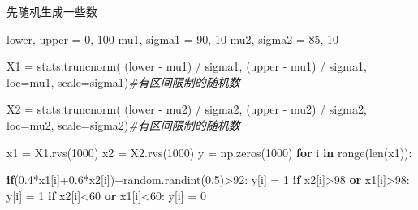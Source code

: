 \documentclass[
]{article}
\newenvironment{Shaded}{}{}
\newcommand{\BuiltInTok}[1]{#1}
\newcommand{\CommentTok}[1]{\textcolor[rgb]{0.38,0.63,0.69}{\textit{#1}}}
\newcommand{\ControlFlowTok}[1]{\textcolor[rgb]{0.00,0.44,0.13}{\textbf{#1}}}
\newcommand{\DecValTok}[1]{\textcolor[rgb]{0.25,0.63,0.44}{#1}}
\newcommand{\FloatTok}[1]{\textcolor[rgb]{0.25,0.63,0.44}{#1}}
\newcommand{\KeywordTok}[1]{\textcolor[rgb]{0.00,0.44,0.13}{\textbf{#1}}}
\newcommand{\NormalTok}[1]{#1}
\newcommand{\OperatorTok}[1]{\textcolor[rgb]{0.40,0.40,0.40}{#1}}
\begin{document}
先随机生成一些数

\begin{Shaded}
\begin{Highlighting}[]
\NormalTok{lower, upper }\OperatorTok{=} \DecValTok{0}\NormalTok{, }\DecValTok{100}
\NormalTok{mu1, sigma1 }\OperatorTok{=} \DecValTok{90}\NormalTok{, }\DecValTok{10}
\NormalTok{mu2, sigma2 }\OperatorTok{=} \DecValTok{85}\NormalTok{, }\DecValTok{10}

\NormalTok{X1 }\OperatorTok{=}\NormalTok{ stats.truncnorm(}
\NormalTok{    (lower }\OperatorTok{{-}}\NormalTok{ mu1) }\OperatorTok{/}\NormalTok{ sigma1, (upper }\OperatorTok{{-}}\NormalTok{ mu1) }\OperatorTok{/}\NormalTok{ sigma1, loc}\OperatorTok{=}\NormalTok{mu1, scale}\OperatorTok{=}\NormalTok{sigma1)}\CommentTok{\#有区间限制的随机数}

\NormalTok{X2 }\OperatorTok{=}\NormalTok{ stats.truncnorm(}
\NormalTok{    (lower }\OperatorTok{{-}}\NormalTok{ mu2) }\OperatorTok{/}\NormalTok{ sigma2, (upper }\OperatorTok{{-}}\NormalTok{ mu2) }\OperatorTok{/}\NormalTok{ sigma2, loc}\OperatorTok{=}\NormalTok{mu2, scale}\OperatorTok{=}\NormalTok{sigma2)}\CommentTok{\#有区间限制的随机数}

\NormalTok{x1 }\OperatorTok{=}\NormalTok{ X1.rvs(}\DecValTok{1000}\NormalTok{)}
\NormalTok{x2 }\OperatorTok{=}\NormalTok{ X2.rvs(}\DecValTok{1000}\NormalTok{)}
\NormalTok{y }\OperatorTok{=}\NormalTok{ np.zeros(}\DecValTok{1000}\NormalTok{)}
\ControlFlowTok{for}\NormalTok{ i }\KeywordTok{in} \BuiltInTok{range}\NormalTok{(}\BuiltInTok{len}\NormalTok{(x1)):}
    
    \ControlFlowTok{if}\NormalTok{(}\FloatTok{0.4}\OperatorTok{*}\NormalTok{x1[i]}\OperatorTok{+}\FloatTok{0.6}\OperatorTok{*}\NormalTok{x2[i])}\OperatorTok{+}\NormalTok{random.randint(}\DecValTok{0}\NormalTok{,}\DecValTok{5}\NormalTok{)}\OperatorTok{\textgreater{}}\DecValTok{92}\NormalTok{:}
\NormalTok{        y[i] }\OperatorTok{=} \DecValTok{1}
    \ControlFlowTok{if}\NormalTok{ x2[i]}\OperatorTok{\textgreater{}}\DecValTok{98} \KeywordTok{or}\NormalTok{ x1[i]}\OperatorTok{\textgreater{}}\DecValTok{98}\NormalTok{:}
\NormalTok{        y[i] }\OperatorTok{=} \DecValTok{1}
    \ControlFlowTok{if}\NormalTok{ x2[i]}\OperatorTok{\textless{}}\DecValTok{60} \KeywordTok{or}\NormalTok{ x1[i]}\OperatorTok{\textless{}}\DecValTok{60}\NormalTok{:}
\NormalTok{        y[i] }\OperatorTok{=} \DecValTok{0}


\end{Highlighting}
\end{Shaded}
\end{document}
